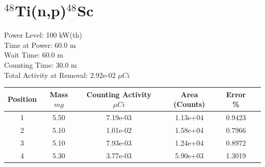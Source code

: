 \newpage

\section*{ $^{48}$Ti(n,p)$^{48}$Sc }

Power Level: 100 kW(th) \\
Time at Power: 60.0 m \\
Wait Time: 60.0 m \\
Counting Time: 30.0 m \\
Total Activity at Removal: 2.92e-02 $\mu Ci$

\begin{table}[h]
\centering
\begin{tabular}{ |c|c|c|c|c|c| }
 \hline
 Position & Mass $mg$ & Counting Activity $\mu Ci$ & Area (Counts) & Error \% \\
 \hline 
 1 & 5.50 & 7.19e-03 & 1.13e+04 & 0.9423 \\ 
\hline
 2 & 5.10 & 1.01e-02 & 1.58e+04 & 0.7966 \\ 
\hline
 3 & 5.10 & 7.93e-03 & 1.24e+04 & 0.8972 \\ 
\hline
 4 & 5.30 & 3.77e-03 & 5.90e+03 & 1.3019 \\ 
\hline
\end{tabular}
\end{table}

